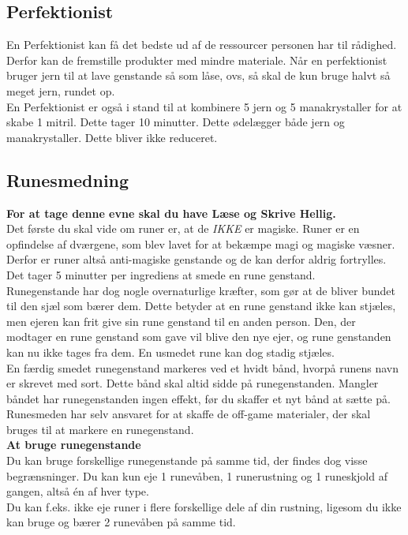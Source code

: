 \subsection*{Perfektionist}
En Perfektionist kan få det bedste ud af de ressourcer personen har til rådighed. Derfor kan de fremstille produkter med mindre materiale. Når en perfektionist bruger jern til at lave genstande så som låse, ovs, så skal de kun bruge halvt så meget jern, rundet op.\\

En Perfektionist er også i stand til at kombinere 5 jern og 5 manakrystaller for at skabe 1 mitril. Dette tager 10 minutter. Dette ødelægger både jern og manakrystaller. Dette bliver ikke reduceret.\\


\subsection*{Runesmedning}
\textbf{For at tage denne evne skal du have Læse og Skrive Hellig.}\\
Det første du skal vide om runer er, at de \emph{IKKE} er magiske. Runer er en opfindelse af dværgene, som blev lavet for at bekæmpe magi og magiske væsner. Derfor er runer altså anti-magiske genstande og de kan derfor aldrig fortrylles.\\
Det tager 5 minutter per ingrediens at smede en rune genstand.\\
Runegenstande har dog nogle overnaturlige kræfter, som gør at de bliver bundet til den sjæl som bærer dem. Dette betyder at en rune genstand ikke kan stjæles, men ejeren kan frit give sin rune genstand til en anden person. Den, der modtager en rune genstand som gave vil blive den nye ejer, og rune genstanden kan nu ikke tages fra dem. En usmedet rune kan dog stadig stjæles.\\

En færdig smedet runegenstand markeres ved et hvidt bånd, hvorpå runens navn er skrevet med sort. Dette bånd skal altid sidde på runegenstanden. Mangler båndet har runegenstanden ingen effekt, før du skaffer et nyt bånd at sætte på. Runesmeden har selv ansvaret for at skaffe de off-game materialer, der skal bruges til at markere en runegenstand.\\

\textbf{At bruge runegenstande}\\
Du kan bruge forskellige runegenstande på samme tid, der findes dog visse begrænsninger. Du kan
kun eje 1 runevåben, 1 runerustning og 1 runeskjold af gangen, altså én af hver type.\\
Du kan f.eks. ikke eje runer i flere forskellige dele af din rustning, ligesom du ikke kan bruge og bærer 2 runevåben på samme tid.\\

